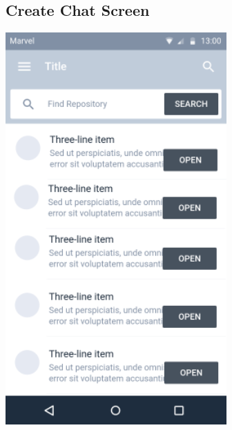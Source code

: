 \documentclass{report}
\begin{document}
\subsection{Create Chat Screen}
\begin{center}
    \includegraphics[scale=0.6]{design-create-chat}
\end{center}

\newpage
\end{document}
